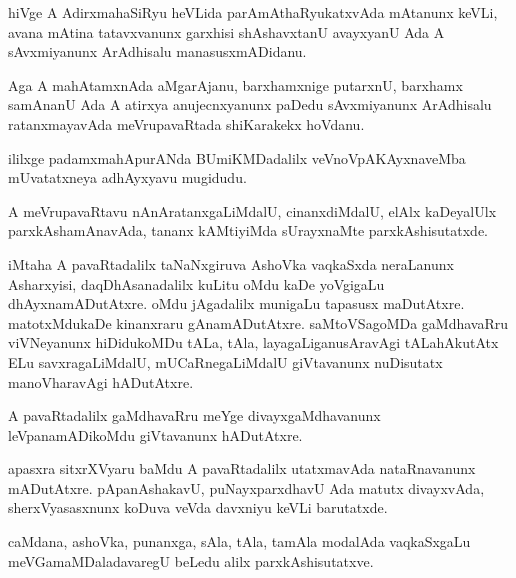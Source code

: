 \documentclass{article}
\begin{document}
\begin{mn}
hiVge A AdirxmahaSiRyu heVLida parAmAthaRyukatxvAda mAtanunx keVLi, avana mAtina 
tatavxvanunx garxhisi shAshavxtanU  avayxyanU Ada A sAvxmiyanunx ArAdhisalu manasusxmADidanu.
\end{mn}

\begin{mn}
Aga A mahAtamxnAda aMgarAjanu, barxhamxnige putarxnU, barxhamx samAnanU Ada A atirxya 
anujecnxyanunx paDedu sAvxmiyanunx ArAdhisalu ratanxmayavAda meVrupavaRtada shiKarakekx hoVdanu.
\end{mn}

\begin{mn}
ililxge padamxmahApurANda BUmiKMDadalilx veVnoVpAKAyxnaveMba mUvatatxneya adhAyxyavu mugidudu.
\end{mn}




\begin{mn}
A meVrupavaRtavu nAnAratanxgaLiMdalU, cinanxdiMdalU, elAlx kaDeyalUlx 
parxkAshamAnavAda, tananx kAMtiyiMda sUrayxnaMte parxkAshisutatxde.
\end{mn}

\begin{mn}
iMtaha  A pavaRtadalilx taNaNxgiruva AshoVka vaqkaSxda neraLanunx Asharxyisi, 
daqDhAsanadalilx kuLitu oMdu kaDe yoVgigaLu dhAyxnamADutAtxre. oMdu jAgadalilx  
munigaLu tapasusx maDutAtxre.  matotxMdukaDe kinanxraru gAnamADutAtxre.  
saMtoVSagoMDa gaMdhavaRru viVNeyanunx hiDidukoMDu tALa, tAla, 
layagaLiganusAravAgi tALahAkutAtx ELu savxragaLiMdalU, mUCaRnegaLiMdalU 
giVtavanunx nuDisutatx  manoVharavAgi hADutAtxre.
\end{mn}

\begin{mn}
A pavaRtadalilx gaMdhavaRru meYge divayxgaMdhavanunx leVpanamADikoMdu giVtavanunx hADutAtxre.
\end{mn}

\begin{mn}
apasxra sitxrXVyaru  baMdu A pavaRtadalilx utatxmavAda nataRnavanunx mADutAtxre.  
pApanAshakavU, puNayxparxdhavU Ada matutx divayxvAda, sherxVyasasxnunx 
koDuva veVda davxniyu keVLi barutatxde.
\end{mn}

\begin{mn}
caMdana, ashoVka, punanxga, sAla, tAla, tamAla modalAda vaqkaSxgaLu 
meVGamaMDaladavaregU beLedu alilx parxkAshisutatxve. 
\end{mn}
\end{document}
